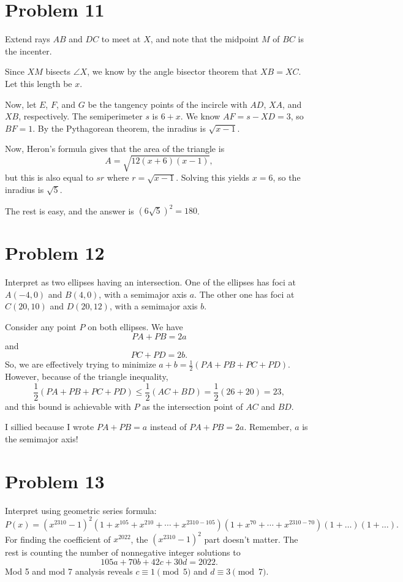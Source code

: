 \documentclass{scrartcl}
\begin{document}
\section*{Problem 11}
Extend rays $AB$ and $DC$ to meet at $X$,
and note that the midpoint $M$ of $BC$ is the incenter.

Since $XM$ bisects $\angle X$, we know by the angle bisector theorem
that $XB = XC$. Let this length be $x$.

Now, let $E$, $F$, and $G$ be the tangency points of the
incircle with $AD$, $XA$, and $XB$, respectively.
The semiperimeter $s$ is $6+x$.
We know $AF = s - XD = 3$, so $BF = 1$.
By the Pythagorean theorem, the inradius is $\sqrt{x-1}$.

Now, Heron's formula gives that the area of the triangle is
\[ A = \sqrt{12(x+6)(x-1)}, \]
but this is also equal to $sr$ where $r = \sqrt{x-1}$.
Solving this yields $x = 6$, so the inradius is $\sqrt{5}$.

The rest is easy, and the answer is $(6\sqrt5)^2 = \boxed{180}$.

\section*{Problem 12}
Interpret as two ellipses having an intersection.
One of the ellipses has foci at $A(-4,0)$ and $B(4,0)$, with a semimajor axis $a$.
The other one has foci at $C(20,10)$ and $D(20,12)$, with a semimajor axis $b$.

Consider any point $P$ on both ellipses.
We have
\[ PA + PB = 2a \]
and
\[ PC + PD = 2b. \]
So, we are effectively trying to minimize $a+b = \frac12 (PA + PB + PC + PD)$.
However, because of the triangle inequality,
\[ \frac12 (PA + PB + PC + PD) \le \frac12 (AC + BD) = \frac12 (26 + 20) = \boxed{23}, \]
and this bound is achievable with $P$ as the intersection point of $AC$ and $BD$.
\begin{remark*}
    I sillied because I wrote $PA + PB = a$ instead of $PA + PB = 2a$.
    Remember, $a$ is the semimajor axis!
\end{remark*}

\section*{Problem 13}
Interpret using geometric series formula:
\[ P(x) = (x^{2310} - 1)^2 (1+x^{105} + x^{210} + \cdots + x^{2310-105})(1+x^{70} + \cdots + x^{2310-70})(1+\dots)(1+\dots).\]
For finding the coefficient of $x^{2022}$, the $(x^{2310} - 1)^2$ part doesn't matter.
The rest is counting the number of nonnegative integer solutions to
\[ 105a + 70b + 42c + 30d = 2022. \]
Mod 5 and mod 7 analysis reveals $c \equiv 1\pmod{5}$ and $d \equiv 3 \pmod{7}$.
\end{document}
